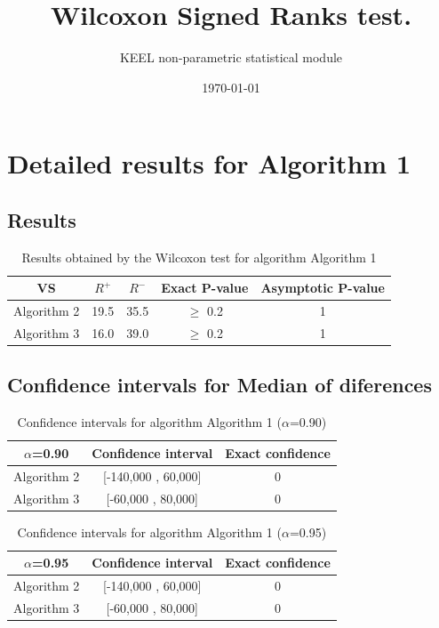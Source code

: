 \documentclass[a4paper,10pt]{article}
\title{Wilcoxon Signed Ranks test.}
\date{\today}
\author{KEEL non-parametric statistical module}
\begin{document}
\pagestyle{empty}
\maketitle
\thispagestyle{empty}



\section{Detailed results for Algorithm 1}


\subsection{Results}

\begin{table}[!htp]
\centering\small
\begin{tabular}{
|c|c|c|c|c|}
\hline
 VS & $R^{+}$ & $R^{-}$ & Exact P-value & Asymptotic P-value \\ \hline 
Algorithm 2 & 19.5 & 35.5 & $\geq$ 0.2 & 1\\ \hline 
Algorithm 3 & 16.0 & 39.0 & $\geq$ 0.2 & 1\\ \hline 

\end{tabular}
\caption{Results obtained by the Wilcoxon test for algorithm Algorithm 1}
\end{table}

\subsection{Confidence intervals for Median of diferences}

\begin{table}[!htp]
\centering\small
\begin{tabular}{
|c|c|c|}
\hline
 $\alpha$=0.90 & Confidence interval & Exact confidence \\ \hline 
Algorithm 2 & [-140,000 , 60,000] & 0\\ \hline 
Algorithm 3 & [-60,000 , 80,000] & 0\\ \hline 

\end{tabular}
\caption{Confidence intervals for algorithm Algorithm 1 ($\alpha$=0.90)}
\end{table}
\begin{table}[!htp]
\centering\small
\begin{tabular}{
|c|c|c|}
\hline
 $\alpha$=0.95 & Confidence interval & Exact confidence \\ \hline 
Algorithm 2 & [-140,000 , 60,000] & 0\\ \hline 
Algorithm 3 & [-60,000 , 80,000] & 0\\ \hline 

\end{tabular}
\caption{Confidence intervals for algorithm Algorithm 1 ($\alpha$=0.95)}
\end{table}
\end{document}
